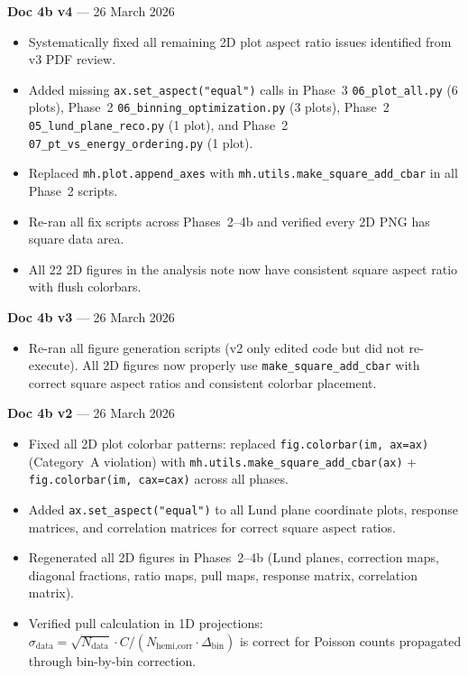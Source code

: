 \documentclass[11pt,a4paper]{article}
\begin{document}
\medskip

\textbf{Doc 4b v4} --- 26 March 2026
\begin{itemize}
\item Systematically fixed all remaining 2D plot aspect ratio issues identified from v3 PDF review.
\item Added missing \texttt{ax.set\_aspect("equal")} calls in Phase~3 \texttt{06\_plot\_all.py} (6 plots), Phase~2 \texttt{06\_binning\_optimization.py} (3 plots), Phase~2 \texttt{05\_lund\_plane\_reco.py} (1 plot), and Phase~2 \texttt{07\_pt\_vs\_energy\_ordering.py} (1 plot).
\item Replaced \texttt{mh.plot.append\_axes} with \texttt{mh.utils.make\_square\_add\_cbar} in all Phase~2 scripts.
\item Re-ran all fix scripts across Phases~2--4b and verified every 2D PNG has square data area.
\item All 22 2D figures in the analysis note now have consistent square aspect ratio with flush colorbars.
\end{itemize}

\medskip

\textbf{Doc 4b v3} --- 26 March 2026
\begin{itemize}
\item Re-ran all figure generation scripts (v2 only edited code but did not re-execute). All 2D figures now properly use \texttt{make\_square\_add\_cbar} with correct square aspect ratios and consistent colorbar placement.
\end{itemize}

\medskip

\textbf{Doc 4b v2} --- 26 March 2026
\begin{itemize}
\item Fixed all 2D plot colorbar patterns: replaced \texttt{fig.colorbar(im, ax=ax)} (Category~A violation) with \texttt{mh.utils.make\_square\_add\_cbar(ax)} + \texttt{fig.colorbar(im, cax=cax)} across all phases.
\item Added \texttt{ax.set\_aspect("equal")} to all Lund plane coordinate plots, response matrices, and correlation matrices for correct square aspect ratios.
\item Regenerated all 2D figures in Phases~2--4b (Lund planes, correction maps, diagonal fractions, ratio maps, pull maps, response matrix, correlation matrix).
\item Verified pull calculation in 1D projections: $\sigma_\text{data} = \sqrt{N_\text{data}} \cdot C / (N_\text{hemi,corr} \cdot \Delta_\text{bin})$ is correct for Poisson counts propagated through bin-by-bin correction.
\end{itemize}
\end{document}
